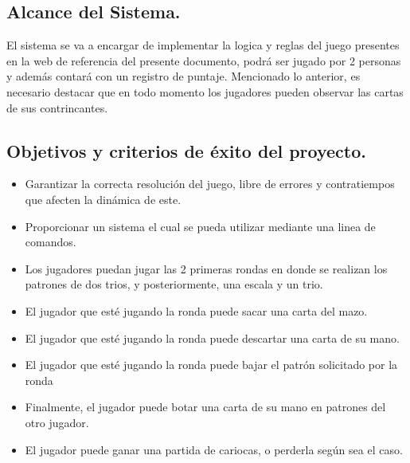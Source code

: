 \subsection{Alcance del Sistema.}\label{cap:alcance}
El sistema se va a encargar de implementar la logica y reglas del juego presentes en la web de referencia del presente documento, 
podrá ser jugado por 2 personas y además contará con un registro de puntaje. Mencionado lo anterior, es necesario destacar 
que en todo momento los jugadores pueden observar las cartas de sus contrincantes.

\subsection{Objetivos y criterios de éxito del proyecto.}\label{cap:objetivos}
\begin{itemize}
    \item Garantizar la correcta resolución del juego, libre de errores y contratiempos que afecten la dinámica de este.
    \item Proporcionar un sistema el cual se pueda utilizar mediante una linea de comandos.
    \item Los jugadores puedan jugar las 2 primeras rondas en donde se realizan los patrones de dos trios, y posteriormente, una
    escala y un trio.
    \item El jugador que esté jugando la ronda puede sacar una carta del mazo.
    \item El jugador que esté jugando la ronda puede descartar una carta de su mano.
    \item El jugador que esté jugando la ronda puede bajar el patrón solicitado por la ronda
    \item Finalmente, el jugador puede botar una carta de su mano en patrones del otro jugador.
    \item El jugador puede ganar una partida de cariocas, o perderla según sea el caso.
\end{itemize}

\pagebreak
